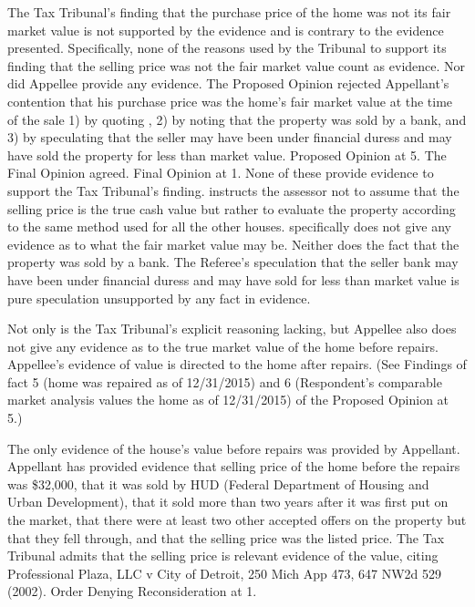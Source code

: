 The Tax Tribunal's finding that the purchase price of the home was not its fair market value is not supported by the evidence and is contrary to the evidence presented. Specifically, none of the reasons used by the Tribunal to support its finding that the selling price was not the fair market value count as evidence. Nor did Appellee provide any evidence. The Proposed Opinion rejected Appellant's contention that his purchase price was the home's fair market value at the time of the sale 1) by quoting , 2) by noting that the property was sold by a bank, and 3) by speculating that the seller may have been under financial duress and may have sold the property for less than market value. Proposed Opinion at 5. The Final Opinion agreed. Final Opinion at 1. None of these provide evidence to support the Tax Tribunal's finding.  instructs the assessor not to assume that the selling price is the true cash value but rather to evaluate the property according to the same method used for all the other houses.  specifically does not give any evidence as to what the fair market value may be. Neither does the fact that the property was sold by a bank. The Referee's speculation that the seller bank may have been under financial duress and may have sold for less than market value is pure speculation unsupported by any fact in evidence. 

Not only is the Tax Tribunal's explicit reasoning lacking, but Appellee also does not give any evidence as to the true market value of the home before repairs. Appellee's evidence of value is directed to the home after repairs. (See Findings of fact 5 (home was repaired as of 12/31/2015) and 6 (Respondent's comparable market analysis values the home as of 12/31/2015) of the Proposed Opinion at 5.)

The only evidence of the house's value before repairs was provided by Appellant. Appellant has provided evidence that selling price of the home before the repairs was \$32,000, that it was sold by HUD (Federal Department of Housing and Urban Development), that it sold more than two years after it was first put on the market, that there were at least two other accepted offers on the property but that they fell through, and that the selling price was the listed price. The Tax Tribunal admits that the selling price is relevant evidence of the value, citing Professional Plaza, LLC v City of Detroit, 250 Mich App 473, 647 NW2d 529 (2002). Order Denying Reconsideration at 1. 


